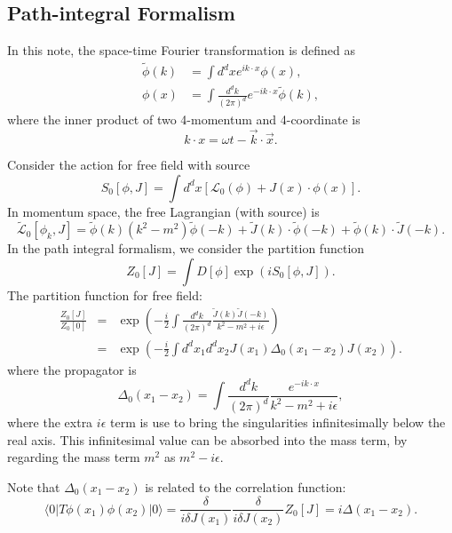 \subsection{Path-integral Formalism}
In this note, the space-time Fourier transformation is defined as
\begin{equation}
\begin{aligned}
	\tilde{\phi}(k) &= \int d^{d}x e^{ik\cdot x} \phi(x), \\ 
	\phi(x) &= \int \frac{d^{d}k}{(2\pi)^{d}} e^{-ik\cdot x}\tilde{\phi}(k),
\end{aligned}
\end{equation}
where the inner product of two 4-momentum and 4-coordinate is
\begin{equation}
	k\cdot x=\omega t-\vec k\cdot \vec x.
\end{equation}

Consider the action for free field with source
\begin{equation}
	S_0[\phi,J]
	= \int d^dx\left[\mathcal{L}_0(\phi) + J(x)\cdot\phi(x) \right].
\end{equation}
In momentum space, the free Lagrangian (with source) is 
\begin{equation*}
	\tilde{\mathcal L}_0[\phi_k,J]=\tilde\phi(k)( k^2-m^2)\tilde\phi(-k)+\tilde J(k)\cdot\tilde\phi(-k)+\tilde\phi(k)\cdot\tilde J(-k).
\end{equation*}
In the path integral formalism, we consider the partition function 
\begin{equation}
	Z_0[J] = \int D[\phi] \exp(iS_0[\phi,J]).
\end{equation}
The partition function for free field:
\begin{eqnarray*}
	\frac{Z_0[J]}{Z_0[0]}
	&=& \exp\left(-\frac{i}{2}\int \frac{d^dk}{(2\pi)^d} \frac{\tilde J(k) \tilde J(-k)}{k^2-m^2+i\epsilon} \right) \\
	&=& \exp\left(-\frac{i}{2}\int d^dx_1 d^dx_2 J(x_1)\Delta_0(x_1-x_2)J(x_2)\right).
\end{eqnarray*}
where the propagator is
\begin{equation}
	\Delta_0(x_1-x_2) = \int \frac{d^dk}{(2\pi)^d} \frac{e^{-ik\cdot x}}{k^2-m^2+i\epsilon},
\end{equation}
where the extra $i\epsilon$ term is use to bring the singularities infinitesimally below the real axis. 
This infinitesimal value can be absorbed into the mass term, by regarding the mass term $m^2$ as $m^2-i\epsilon$.

Note that $\Delta_0(x_1-x_2)$ is related to the correlation function:
\begin{equation}
	\langle 0| T\phi(x_1)\phi(x_2)|0\rangle
	= \frac{\delta}{i\delta J(x_1)}\frac{\delta}{i\delta J(x_2)} Z_0[J] 
	= i\Delta(x_1-x_2).
\end{equation}

